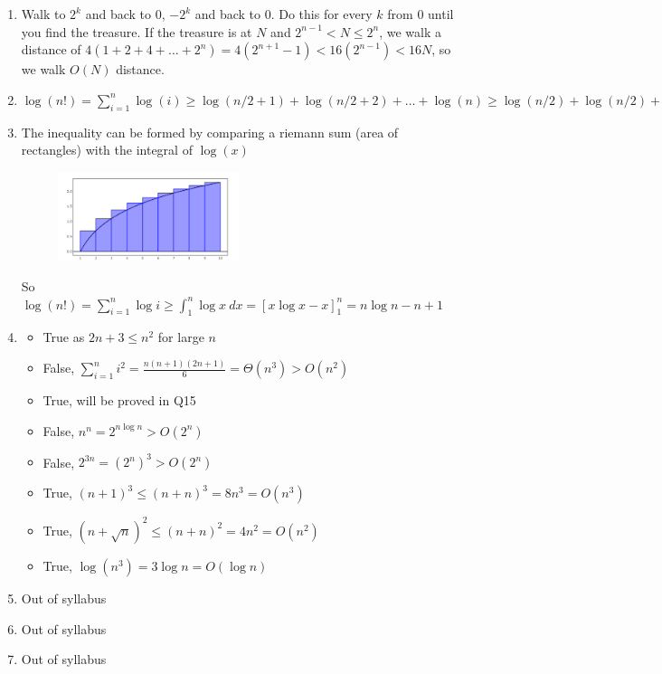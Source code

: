 \documentclass[12pt]{report}
\begin{document}
\begin{enumerate}[label=\textbf{\arabic*.}]
  \item Walk to $2^k$ and back to $0$, $-2^k$ and back to $0$. Do this for every $k$ from $0$ until you find the
  treasure. If the treasure is at $N$ and $2^{n-1} < N \leq 2^n$, we walk a distance of $4(1+2+4+\dots+2^n) = 
  4(2^{n+1} -1) < 16(2^{n-1}) < 16N$, so we walk $O(N)$ distance.

  \item $\log(n!) = \sum_{i=1}^{n} \log(i) \geq \log(n/2+1) + \log(n/2+2) + \dots + \log(n) \geq \log(n/2) + \log(n/2) 
  + \dots + \log(n/2) = (n/2) \log(n/2) = (n/2) (\log n - 1) = (1/2) n \log n - n/2$

  \item The inequality can be formed by comparing a riemann sum (area of rectangles) with the integral of $\log(x)$
  \begin{figure}[H]
    \centering
    \includegraphics[width=0.5\textwidth]{logxGraph.png}  
  \end{figure}
  So $\log(n!) = \sum_{i=1}^{n} \log i \geq \int_{1}^{n} \log x \ dx = [x \log x - x]_1^n = n \log n - n + 1$

  \item 
  \begin{itemize}
    \item True as $2n+3 \leq n^2$ for large $n$
    \item False, $\sum_{i=1}^{n} i^2 = \frac{n(n+1)(2n+1)}{6} = \Theta(n^3) > O(n^2)$
    \item True, will be proved in Q15 
    \item False, $n^n = 2^{n \log n} > O(2^n)$
    \item False, $2^{3n} = {(2^n)}^3 > O(2^n)$
    \item True, ${(n+1)}^3 \leq {(n+n)}^3 = 8n^3 = O(n^3)$
    \item True, ${(n+\sqrt{n})}^2 \leq {(n+n)}^2 = 4n^2 = O(n^2)$
    \item True, $\log(n^3) = 3 \log n = O(\log n)$
  \end{itemize}

  \item Out of syllabus
  \item Out of syllabus
  \item Out of syllabus

\end{enumerate}
\end{document}
